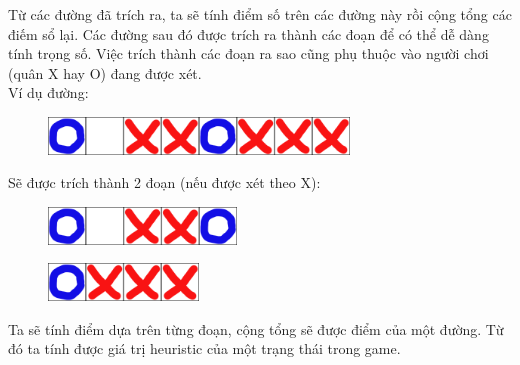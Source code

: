 \documentclass[12pt]{report}
\begin{document}
Từ các đường đã trích ra, ta sẽ tính điểm số trên các đường này rồi cộng tổng các điếm sổ lại. 
Các đường sau đó được trích ra thành các đoạn để có thể dễ dàng tính trọng số. 
Việc trích thành các đoạn ra sao cũng phụ thuộc vào người chơi (quân X hay O) đang được xét. \\
Ví dụ đường: 
\begin{figure}[H]
\centering
\includegraphics[width=8cm]{line2.png}
\end{figure}
\noindent Sẽ được trích thành 2 đoạn (nếu được xét theo X): 
\begin{figure}[H]
\centering
\includegraphics[width=5cm]{segment1.png}
\end{figure}
\begin{figure}[H]
\centering
\includegraphics[width=4cm]{segment2.png}
\end{figure}
Ta sẽ tính điểm dựa trên từng đoạn, cộng tổng sẽ được điểm của một đường. 
Từ đó ta tính được giá trị heuristic của một trạng thái trong game. 
\end{document}
